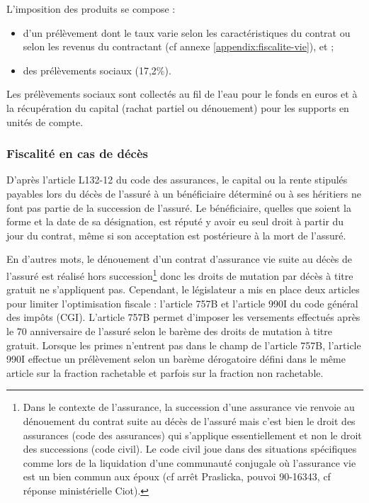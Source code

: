 \documentclass{article}
\begin{document}
L'imposition des produits se compose :
\begin{itemize}
    \item d'un prélèvement dont le taux varie selon les caractéristiques du contrat ou selon les revenus du contractant (cf annexe \ref{appendix:fiscalite-vie}), et ;
    \item des prélèvements sociaux (17,2\%).
\end{itemize}

Les prélèvements sociaux sont collectés au fil de l'eau pour le fonds en euros et à la récupération du capital (rachat partiel ou dénouement) pour les supports en unités de compte.

\subsubsection{Fiscalité en cas de décès}
D'après l'article L132-12 du code des assurances, \og le capital ou la rente stipulés payables lors du décès de l'assuré à un bénéficiaire déterminé ou à ses héritiers ne font pas partie de la succession de l'assuré. Le bénéficiaire, quelles que soient la forme et la date de sa désignation, est réputé y avoir eu seul droit à partir du jour du contrat, même si son acceptation est postérieure à la mort de l'assuré. \fg 

En d'autres mots, le dénouement d'un contrat d'assurance vie suite au décès de l'assuré est réalisé hors succession\footnote{Dans le contexte de l'assurance, la succession d'une assurance vie renvoie au dénouement du contrat suite au décès de l'assuré mais c'est bien le droit des assurances (code des assurances) qui s'applique essentiellement et non le droit des successions (code civil). Le code civil joue dans des situations spécifiques comme lors de la liquidation d'une communauté conjugale où l'assurance vie est un bien commun aux époux (cf arrêt Praslicka, pouvoi 90-16343, cf réponse ministérielle Ciot).} donc les droits de mutation par décès à titre gratuit ne s'appliquent pas. Cependant, le législateur a mis en place deux articles pour limiter l'optimisation fiscale : l'article 757B et l'article 990I du code général des impôts (CGI). L'article 757B permet d'imposer les versements effectués après le 70 anniversaire de l'assuré selon le barème des droits de mutation à titre gratuit. Lorsque les primes n'entrent pas dans le champ de l'article 757B, l'article 990I effectue un prélèvement selon un barème dérogatoire défini dans le même article sur la fraction rachetable et parfois sur la fraction non rachetable.
\end{document}
